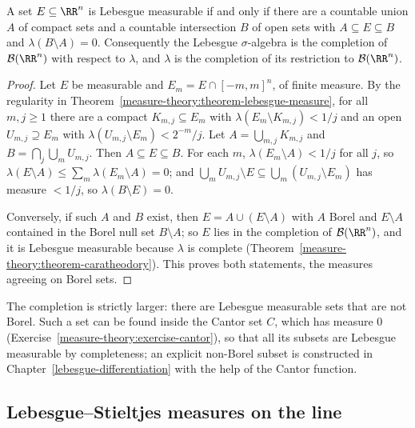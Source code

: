 \begin{proposition}\label{measure-theory:proposition-lebesgue-completion}
A set $E \subseteq \RR^n$ is Lebesgue measurable if and only if there are a countable union $A$ of compact sets and a countable intersection $B$ of open sets with $A \subseteq E \subseteq B$ and
$\lambda(B \setminus A) = 0$. Consequently the Lebesgue $\sigma$-algebra is the completion of $\mathcal{B}(\RR^n)$ with respect to $\lambda$, and $\lambda$ is the completion of its restriction to
$\mathcal{B}(\RR^n)$.
\end{proposition}

\begin{proof}
Let $E$ be measurable and $E_m = E \cap [-m, m]^n$, of finite measure. By the regularity in Theorem~\ref{measure-theory:theorem-lebesgue-measure}, for all $m, j \geq 1$ there are a compact
$K_{m,j} \subseteq E_m$ with $\lambda(E_m \setminus K_{m,j}) < 1/j$ and an open $U_{m,j} \supseteq E_m$ with $\lambda(U_{m,j} \setminus E_m) < 2^{-m}/j$. Let $A = \bigcup_{m,j}K_{m,j}$ and
$B = \bigcap_j\bigcup_mU_{m,j}$. Then $A \subseteq E \subseteq B$. For each $m$, $\lambda(E_m \setminus A) < 1/j$ for all $j$, so $\lambda(E \setminus A) \leq \sum_m\lambda(E_m \setminus A) = 0$; and
$\bigcup_mU_{m,j} \setminus E \subseteq \bigcup_m(U_{m,j} \setminus E_m)$ has measure $< 1/j$, so $\lambda(B \setminus E) = 0$.

Conversely, if such $A$ and $B$ exist, then $E = A \cup (E \setminus A)$ with $A$ Borel and $E \setminus A$ contained in the Borel null set $B \setminus A$; so $E$ lies in the completion of
$\mathcal{B}(\RR^n)$, and it is Lebesgue measurable because $\lambda$ is complete (Theorem~\ref{measure-theory:theorem-caratheodory}). This proves both statements, the measures agreeing on Borel sets.
\end{proof}

\begin{remark}\label{measure-theory:remark-lebesgue-not-borel}
The completion is strictly larger: there are Lebesgue measurable sets that are not Borel. Such a set can be found inside the Cantor set $C$, which has measure $0$
(Exercise~\ref{measure-theory:exercise-cantor}), so that all its subsets are Lebesgue measurable by completeness; an explicit non-Borel subset is constructed in Chapter~\ref{lebesgue-differentiation}
with the help of the Cantor function.
\end{remark}

\subsection{Lebesgue--Stieltjes measures on the line}\label{measure-theory:subsection-stieltjes}

